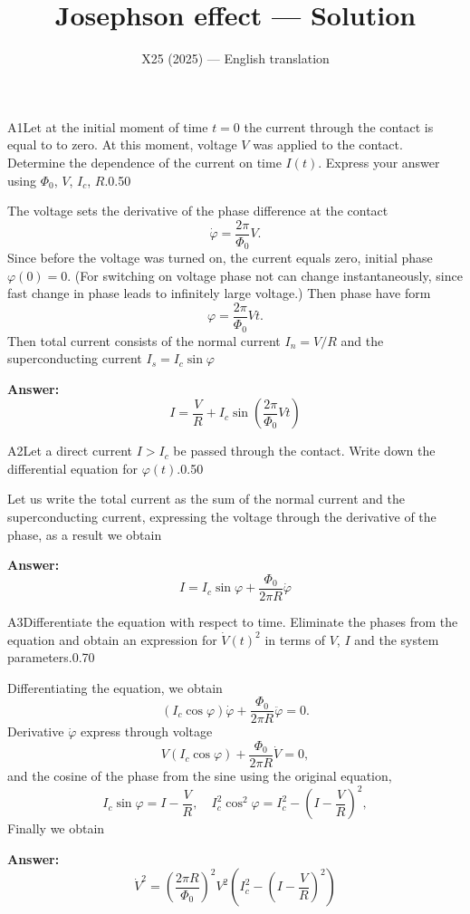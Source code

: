 \documentclass[11pt,a4paper]{article}
\title{\textbf{Josephson effect --- Solution}}
\author{\normalsize X25 (2025) — English translation}
\date{}
\begin{document}
\maketitle\vspace{-0.5em}
\begin{solcard}{A1}{Let at the initial moment of time $t = 0$ the current through the contact is equal to to zero. At this moment, voltage $V$ was applied to the contact.  Determine the dependence of the current on time $I(t)$. Express your answer using $\Phi_0$, $V$, $I_c$, $R$.}{0.50}

The voltage sets the derivative of the phase difference at the contact $$ \dot{\varphi} = \frac{2 \pi} {\Phi_0}V. $$Since before the voltage was turned on, the current equals zero, initial phase $\varphi(0) = 0$. (For switching on voltage phase not can change instantaneously, since fast change in phase leads to infinitely large voltage.) Then phase have form $$ \varphi = \frac{2 \pi} {\Phi_0}V t. $$Then total current consists of the normal current $I_n = V/R$ and the superconducting current $I_s = I_c \sin\varphi$

\par\smallskip\noindent\textbf{Answer:} $$I = \dfrac{V}{R} + I_c \sin \left( \dfrac{2\pi}{\Phi_0}V t\right)$$
\end{solcard}

\begin{solcard}{A2}{Let a direct current $I > I_c$ be passed through the contact.  Write down the differential equation for $\varphi(t)$.}{0.50}

Let us write the total current as the sum of the normal current and the superconducting current, expressing the voltage through the derivative of the phase, as a result we obtain

\par\smallskip\noindent\textbf{Answer:} $$I = I_c \sin \varphi + \dfrac{\Phi_0}{2 \pi R} \dot{\varphi}$$
\end{solcard}

\begin{solcard}{A3}{Differentiate the equation with respect to time. Eliminate the phases from the equation and obtain an expression for $\dot{V}(t)^2$ in terms of $V$, $I$ and the system parameters.}{0.70}

Differentiating the equation, we obtain $$ (I_c \cos \varphi )\dot{\varphi} + \frac{\Phi_0}{2 \pi R} \ddot{\varphi} = 0. $$Derivative $\dot{\varphi}$ express through voltage $$ V (I_c \cos \varphi) + \frac{\Phi_0}{2 \pi R} \dot{V} = 0, $$and the cosine of the phase from the sine using the original equation, $$ I_c \sin \varphi = I - \frac{V}{R}, \quad I_c^2 \cos^2 \varphi = I_c^2 - \left(I - \frac{V}{R} \right)^2, $$Finally we obtain

\par\smallskip\noindent\textbf{Answer:} $$ \dot{V}^2 = \left(\frac{2 \pi R}{\Phi_0} \right)^2 V^2 \left(I_c^2 -  \left(I - \frac{V}{R} \right)^2\right) $$
\end{solcard}
\end{document}
